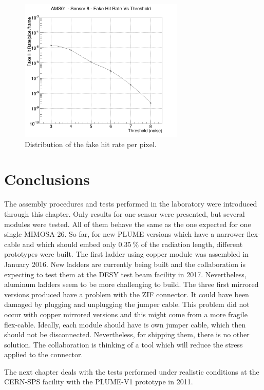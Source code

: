   \begin{figure}[!tbh]
    \centering
    \includegraphics[width=0.7\textwidth]{Pictures/labTests/fake_sensor6.png}
    \caption{Distribution of the fake hit rate per pixel.}
    \label{fig:FHR}
  \end{figure}

\section{Conclusions}

  The assembly procedures and tests performed in the laboratory were introduced through this chapter.
  Only results for one sensor were presented, but several modules were tested. 
  All of them behave the same as the one expected for one single \gls{MIMOSA}-26.
  So far, for new \gls{PLUME} versions which have a narrower flex-cable and which should embed only $0.35~\%$ of the radiation length, different prototypes were built. 
  The first ladder using copper module was assembled in January 2016.
  New ladders are currently being built and the collaboration is expecting to test them at the \gls{DESY} test beam facility in 2017.
  Nevertheless, aluminum ladders seem to be more challenging to build.
  The three first mirrored versions produced have a problem with the \gls{ZIF} connector.
  It could have been damaged by plugging and unplugging the jumper cable.
  This problem did not occur with copper mirrored versions and this might come from a more fragile flex-cable.
  Ideally, each module should have is own jumper cable, which then should not be disconnected.
  Nevertheless, for shipping them, there is no other solution.
  The collaboration is thinking of a tool which will reduce the stress applied to the connector.

  The next chapter deals with the tests performed under realistic conditions at the CERN-SPS facility with the PLUME-V1 prototype in 2011.
